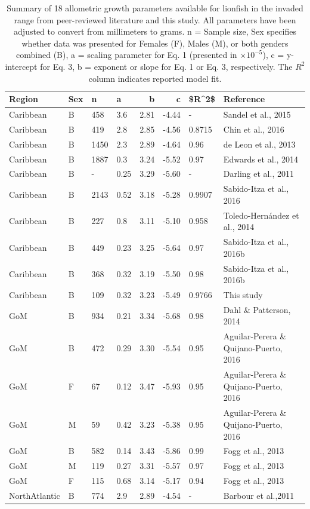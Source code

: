 \documentclass[fleqn,10pt,lineno]{wlpeerj} %
\begin{document}
\begin{table}

\caption{\label{tab:unnamed-chunk-5}\label{tab:all_params}Summary of 18 allometric growth parameters available for lionfish in the invaded range from peer-reviewed literature and this study. All parameters have been adjusted to convert from millimeters to grams. n = Sample size, Sex specifies whether data was presented for Females (F), Males (M), or both genders combined (B), a = scaling parameter for Eq. 1 (presented in $\times 10^{-5}$), c = y-intercept for Eq. 3, b = exponent or slope for Eq. 1 or Eq. 3, respectively. The $R^2$ column indicates reported model fit.}
\centering
\begin{tabular}[t]{llllrrll}
\toprule
Region & Sex & n & a & b & c & \$R\textasciicircum{}2\$ & Reference\\
\midrule
Caribbean & B & 458 & 3.6 & 2.81 & -4.44 & - & Sandel et al., 2015\\
Caribbean & B & 419 & 2.8 & 2.85 & -4.56 & 0.8715 & Chin et al., 2016\\
Caribbean & B & 1450 & 2.3 & 2.89 & -4.64 & 0.96 & de Leon et al., 2013\\
Caribbean & B & 1887 & 0.3 & 3.24 & -5.52 & 0.97 & Edwards et al., 2014\\
Caribbean & B & - & 0.25 & 3.29 & -5.60 & - & Darling et al., 2011\\
\addlinespace
Caribbean & B & 2143 & 0.52 & 3.18 & -5.28 & 0.9907 & Sabido-Itza et al., 2016\\
Caribbean & B & 227 & 0.8 & 3.11 & -5.10 & 0.958 & Toledo-Hernández et al., 2014\\
Caribbean & B & 449 & 0.23 & 3.25 & -5.64 & 0.97 & Sabido-Itza et al., 2016b\\
Caribbean & B & 368 & 0.32 & 3.19 & -5.50 & 0.98 & Sabido-Itza et al., 2016b\\
Caribbean & B & 109 & 0.32 & 3.23 & -5.49 & 0.9766 & This study\\
\addlinespace
GoM & B & 934 & 0.21 & 3.34 & -5.68 & 0.98 & Dahl \& Patterson, 2014\\
GoM & B & 472 & 0.29 & 3.30 & -5.54 & 0.95 & Aguilar-Perera \& Quijano-Puerto, 2016\\
GoM & F & 67 & 0.12 & 3.47 & -5.93 & 0.95 & Aguilar-Perera \& Quijano-Puerto, 2016\\
GoM & M & 59 & 0.42 & 3.23 & -5.38 & 0.95 & Aguilar-Perera \& Quijano-Puerto, 2016\\
GoM & B & 582 & 0.14 & 3.43 & -5.86 & 0.99 & Fogg et al., 2013\\
\addlinespace
GoM & M & 119 & 0.27 & 3.31 & -5.57 & 0.97 & Fogg et al., 2013\\
GoM & F & 115 & 0.68 & 3.14 & -5.17 & 0.94 & Fogg et al., 2013\\
NorthAtlantic & B & 774 & 2.9 & 2.89 & -4.54 & - & Barbour et al.,2011\\
\bottomrule
\end{tabular}
\end{table}
\end{document}
